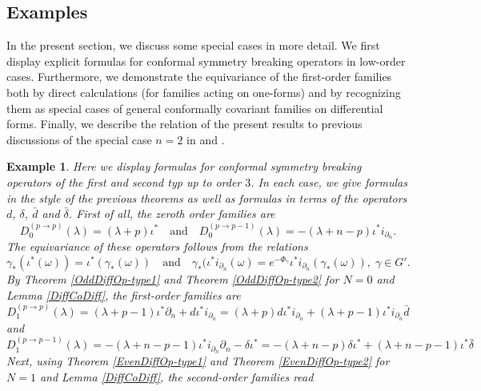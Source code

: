 \documentclass[a4paper,12pt,reqno]{amsart}
\newtheorem{example}[theorem]{Example}
\numberwithin{theorem}{subsection}
\numberwithin{equation}{section}
\begin{document}
\subsection{Examples}\label{examples}

In the present section, we discuss some special cases in more detail. We first
display explicit formulas for conformal symmetry breaking operators in
low-order cases. Furthermore, we demonstrate the equivariance of the
first-order families both by direct calculations (for families acting on
one-forms) and by recognizing them as special cases of general conformally
covariant families on differential forms. Finally, we describe the relation of
the present results to previous discussions of the special case $n=2$ in
\cite{Juhl0} and \cite{KKP}.

\begin{example}\label{LowOrderExampleDiffOp} Here we display formulas for conformal
symmetry breaking operators of the first and second typ up to order $3$. In
each case, we give formulas in the style of the previous theorems as well as
formulas in terms of the operators $d$, $\delta$, $\bar{d}$ and $\bar{\delta}$.
First of all, the zeroth order families are
$$
   D_0^{(p \to p)}(\lambda) = (\lambda\!+\!p) \iota^* \quad \mbox{and} \quad
   D_0^{(p \to p-1)}(\lambda) = -(\lambda\!+\!n\!-\!p) \iota^* i_{\partial_n}.
$$
The equivariance of these operators follows from the relations
$$
   \gamma_* (\iota^*(\omega)) = \iota^*(\gamma_*(\omega)) \quad \mbox{and} \quad
   \gamma_* (\iota^* i_{\partial_n} (\omega) = e^{-\Phi_\gamma} \iota^*
   i_{\partial_n} (\gamma_*(\omega)), \; \gamma \in G'.
$$
By Theorem \ref{OddDiffOp-type1} and Theorem \ref{OddDiffOp-type2} for $N=0$
and Lemma \ref{DiffCoDiff}, the first-order families are
\begin{equation*}
   D^{(p\to p)}_1(\lambda) = (\lambda\!+\!p\!-\!1) \iota^* \partial_n + {d} \iota^*i_{\partial_n}
   =(\lambda\!+\!p){d}\iota^* i_{\partial_n} + (\lambda\!+\!p\!-\!1)\iota^* i_{\partial_n} \bar{d}
\end{equation*}
and
\begin{equation*}
   D^{(p\to p-1)}_{1}(\lambda) = -(\lambda\!+\!n\!-\!p\!-\!1) \iota^*i_{\partial_n} \partial_n - \delta \iota^*
   = -(\lambda\!+\!n\!-\!p) \delta \iota^* + (\lambda\!+\!n\!-\!p\!-\!1) \iota^* \bar{\delta}
\end{equation*}
Next, using Theorem \ref{EvenDiffOp-type1} and Theorem \ref{EvenDiffOp-type2}
for $N=1$ and Lemma \ref{DiffCoDiff}, the second-order families read
\begin{align*}

\end{align*}
\end{example}
\end{document}
